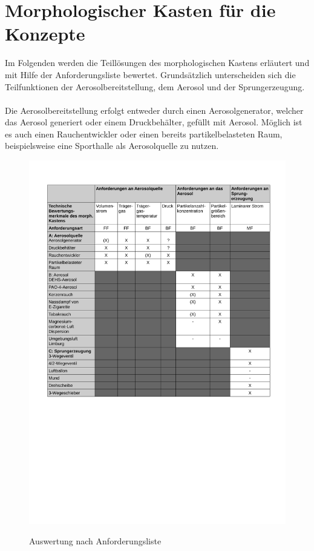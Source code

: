 \section{Morphologischer Kasten f\"{u}r die Konzepte}
Im Folgenden werden die Teill\"{o}sungen des morphologischen Kastens erl\"{a}utert und mit Hilfe der Anforderungsliste bewertet. Grunds\"{a}tzlich unterscheiden sich die Teilfunktionen der Aerosolbereitstellung, dem Aerosol und der Sprungerzeugung.
\\\\
Die Aerosolbereitstellung erfolgt entweder durch einen Aerosolgenerator, welcher das Aerosol generiert oder einem Druckbeh\"{a}lter, gef\"{u}llt mit Aerosol. M\"{o}glich ist es auch einen Rauchentwickler oder einen bereits partikelbelasteten Raum, beispielsweise eine Sporthalle als Aerosolquelle zu nutzen.
\begin{figure}[H]
        \myfloatalign
        {\includegraphics[width=.8\linewidth]{gfx/conclusion/TabEvalOne.pdf}} \quad
        \caption[Auswertung nach Anforderungsliste]
        {Auswertung nach Anforderungsliste}
        \label{fig:TabEvalOne}
\end{figure}
